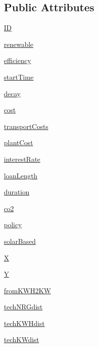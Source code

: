\subsection*{Public Attributes}
\begin{DoxyCompactItemize}
\item 
\hyperlink{classtech_1_1tech_a9dbd30b9df2b75567b29aaa8c844b878}{I\-D}
\item 
\hyperlink{classtech_1_1tech_a9166531a72c39201b57de2c5c85f7e11}{renewable}
\item 
\hyperlink{classtech_1_1tech_afdd9963fbf98fc30ae018753e3d760cf}{efficiency}
\item 
\hyperlink{classtech_1_1tech_a52e319d1591314d587c7ab243b78474d}{start\-Time}
\item 
\hyperlink{classtech_1_1tech_a14c7c10c0d51388ca60749fb5def427e}{decay}
\item 
\hyperlink{classtech_1_1tech_ad1e77d90cb073d305f8abf2f98e88a7f}{cost}
\item 
\hyperlink{classtech_1_1tech_a728f1e576f7907d69f9f4b1490289782}{transport\-Costs}
\item 
\hyperlink{classtech_1_1tech_af2f2237014f333c5c98ff1b0b26432a9}{plant\-Cost}
\item 
\hyperlink{classtech_1_1tech_a4ed4a128ac6c79a285d819f015530c57}{interest\-Rate}
\item 
\hyperlink{classtech_1_1tech_a9622e61df9f500c6e67bb7151553249f}{loan\-Length}
\item 
\hyperlink{classtech_1_1tech_aa9a7f1fa451b5db4940c0cd1c37bc208}{duration}
\item 
\hyperlink{classtech_1_1tech_a149959bdab469141c9b875d13ddc64a5}{co2}
\item 
\hyperlink{classtech_1_1tech_aab8844006e12744b280882d897347ff4}{policy}
\item 
\hyperlink{classtech_1_1tech_a95aa55c0e7bd132a05e48c15fcb420dd}{solar\-Based}
\item 
\hyperlink{classtech_1_1tech_ad0c5a665f6d99e4c1f5e03b55483eb2d}{X}
\item 
\hyperlink{classtech_1_1tech_a9d56090b99261ae3e735d1f7afecca31}{Y}
\item 
\hyperlink{classtech_1_1tech_a7d89b0c96cc0b4d7be2deecbc9667864}{from\-K\-W\-H2\-K\-W}
\item 
\hyperlink{classtech_1_1tech_ad8aa76f37993f5e7dca5b38e4d8eac01}{tech\-N\-R\-Gdist}
\item 
\hyperlink{classtech_1_1tech_abf6d3f1f6d2926f8c8827f5bd44d3112}{tech\-K\-W\-Hdist}
\item 
\hyperlink{classtech_1_1tech_a4218fe3f48dbf6a1cfabfbc25f26fb8d}{tech\-K\-Wdist}
\end{DoxyCompactItemize}


